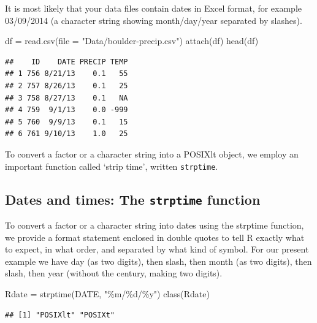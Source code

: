\documentclass[
]{book}
\newenvironment{Shaded}{\begin{snugshade}}{\end{snugshade}}
\newcommand{\AttributeTok}[1]{\textcolor[rgb]{0.77,0.63,0.00}{#1}}
\newcommand{\FunctionTok}[1]{\textcolor[rgb]{0.00,0.00,0.00}{#1}}
\newcommand{\NormalTok}[1]{#1}
\newcommand{\OtherTok}[1]{\textcolor[rgb]{0.56,0.35,0.01}{#1}}
\newcommand{\StringTok}[1]{\textcolor[rgb]{0.31,0.60,0.02}{#1}}
\theoremstyle{definition}
\theoremstyle{definition}
\theoremstyle{definition}
\theoremstyle{definition}
\theoremstyle{remark}
\begin{document}
It is most likely that your data files contain dates in Excel format, for example 03/09/2014 (a character string showing month/day/year separated by slashes).

\begin{Shaded}
\begin{Highlighting}[]
\NormalTok{df }\OtherTok{=} \FunctionTok{read.csv}\NormalTok{(}\AttributeTok{file =} \StringTok{"Data/boulder{-}precip.csv"}\NormalTok{)}
\FunctionTok{attach}\NormalTok{(df)}
\FunctionTok{head}\NormalTok{(df)}
\end{Highlighting}
\end{Shaded}

\begin{verbatim}
##    ID    DATE PRECIP TEMP
## 1 756 8/21/13    0.1   55
## 2 757 8/26/13    0.1   25
## 3 758 8/27/13    0.1   NA
## 4 759  9/1/13    0.0 -999
## 5 760  9/9/13    0.1   15
## 6 761 9/10/13    1.0   25
\end{verbatim}

To convert a factor or a character string into a POSIXlt object, we employ an important function called `strip time', written \texttt{strptime}.

\hypertarget{dates-and-times-the-strptime-function}{%
\subsection{\texorpdfstring{Dates and times: The \texttt{strptime} function}{Dates and times: The strptime function}}\label{dates-and-times-the-strptime-function}}

To convert a factor or a character string into dates using the strptime function, we provide a format statement enclosed in double quotes to tell R exactly what to expect, in what order, and separated by what kind of symbol. For our present example we have day (as two digits), then slash, then month (as two digits), then slash, then year (without the century, making two digits).

\begin{Shaded}
\begin{Highlighting}[]
\NormalTok{Rdate }\OtherTok{=} \FunctionTok{strptime}\NormalTok{(DATE, }\StringTok{"\%m/\%d/\%y"}\NormalTok{)}
\FunctionTok{class}\NormalTok{(Rdate)}
\end{Highlighting}
\end{Shaded}

\begin{verbatim}
## [1] "POSIXlt" "POSIXt"
\end{verbatim}
\end{document}
